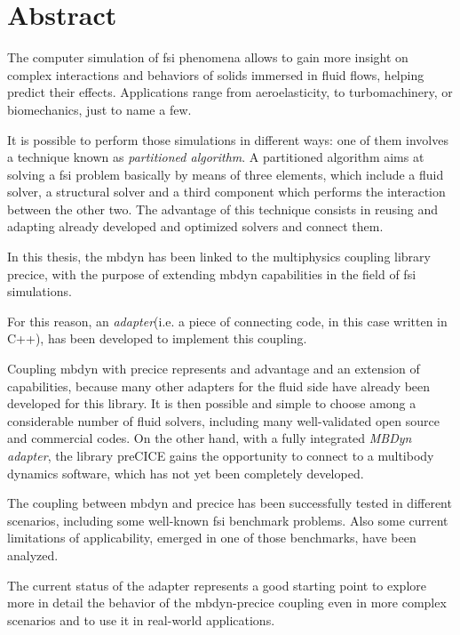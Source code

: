 \chapter*{Abstract}
\label{cha:abstract}


The computer simulation of \acrfull{fsi} phenomena allows to gain more insight on complex interactions and behaviors of solids immersed in fluid flows, helping predict their effects. Applications range from aeroelasticity, to turbomachinery, or biomechanics, just to name a few. 

It is possible to perform those simulations in different ways: one of them involves a technique known as \textit{partitioned algorithm}. A partitioned algorithm aims at solving a \acrshort{fsi} problem basically by means of three elements, which include a fluid solver, a structural solver and a third component which performs the interaction between the other two. The advantage of this technique consists in reusing and adapting already developed and optimized solvers and connect them. 

In this thesis, the \acrfull{mbdyn} has been linked to the multiphysics coupling library \acrfull{precice}, with the purpose of extending \acrshort{mbdyn} capabilities in the field of \acrshort{fsi} simulations.

For this reason, an \textit{adapter}(i.e. a piece of connecting code, in this case written in C++), has been developed to implement this coupling.

Coupling \acrshort{mbdyn} with \acrshort{precice} represents and advantage and an extension of capabilities, because many other adapters for the fluid side have already been developed for this library. It is then  possible and simple to choose among a considerable number of fluid solvers, including many well-validated open source and commercial codes. On the other hand, with a fully integrated \textit{MBDyn adapter}, the library preCICE gains the opportunity to connect to a multibody dynamics software, which has not yet been completely developed.  

The coupling between \acrshort{mbdyn} and \acrshort{precice} has been successfully tested in different scenarios, including some well-known \acrshort{fsi} benchmark problems. Also some current limitations of applicability, emerged in one of those benchmarks, have been analyzed.

The current status of the adapter represents a good starting point to explore more in detail the behavior of the \acrshort{mbdyn}-\acrshort{precice} coupling even in more complex scenarios and to use it in real-world applications.


\vspace{5mm}


